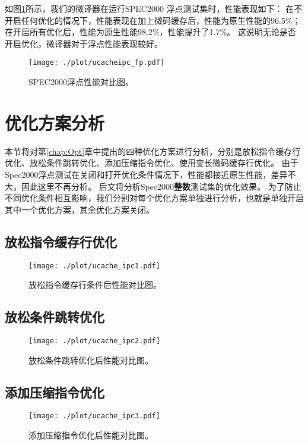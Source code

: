如图\ref{img:ipc_fp}所示，我们的微译器在运行SPEC2000 浮点测试集时，性能表现如下：
在不开启任何优化的情况下，性能表现在加上微码缓存后，性能为原生性能的96.5\%；
在开启所有优化后，性能为原生性能98.2\%，性能提升了1.7\%。
这说明无论是否开启优化，微译器对于浮点性能表现较好。


\begin{figure}[!htbp]
  \centering
  \texttt{[image: ./plot/ucacheipc\_fp.pdf]}
  \caption{SPEC2000浮点性能对比图。}
  \label{img:ipc_fp}
\end{figure}


\section{优化方案分析}

本节将对第\ref{chap:Opt}章中提出的四种优化方案进行分析，分别是放松指令缓存行优化、放松条件跳转优化、添加压缩指令优化、使用变长微码缓存行优化。
由于Spec2000浮点测试在关闭和打开优化条件情况下，性能都接近原生性能，差异不大，因此这里不再分析。
后文将分析Spec2000\textbf{整数}测试集的优化效果。
为了防止不同优化条件相互影响，我们分别对每个优化方案单独进行分析，也就是单独开启其中一个优化方案，其余优化方案关闭。

\subsection{放松指令缓存行优化}

\begin{figure}[!htbp]
  \centering
  \texttt{[image: ./plot/ucache\_ipc1.pdf]}
  \caption{放松指令缓存行条件后性能对比图。}
  \label{img:ipc1}
\end{figure}

\subsection{放松条件跳转优化}

\begin{figure}[!htbp]
  \centering
  \texttt{[image: ./plot/ucache\_ipc2.pdf]}
  \caption{放松条件跳转优化后性能对比图。}
  \label{img:ipc2}
\end{figure}

\subsection{添加压缩指令优化}

\begin{figure}[!htbp]
  \centering
  \texttt{[image: ./plot/ucache\_ipc3.pdf]}
  \caption{添加压缩指令优化后性能对比图。}
  \label{img:ipc3}
\end{figure}

